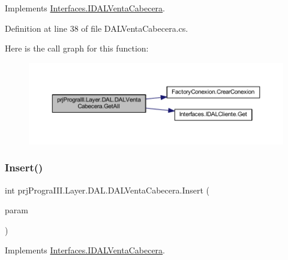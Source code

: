 Implements \hyperlink{interface_interfaces_1_1_i_d_a_l_venta_cabecera_a24d7801773ac5c75332be9f7efdd04b9}{Interfaces.\+I\+D\+A\+L\+Venta\+Cabecera}.



Definition at line 38 of file D\+A\+L\+Venta\+Cabecera.\+cs.

Here is the call graph for this function\+:
\nopagebreak
\begin{figure}[H]
\begin{center}
\leavevmode
\includegraphics[width=350pt]{classprj_progra_i_i_i_1_1_layer_1_1_d_a_l_1_1_d_a_l_venta_cabecera_a136378281851cb3aa0f0791a076b1351_cgraph}
\end{center}
\end{figure}
\hypertarget{classprj_progra_i_i_i_1_1_layer_1_1_d_a_l_1_1_d_a_l_venta_cabecera_a2eecc7b4375e75276b9547217d9727cf}{}\label{classprj_progra_i_i_i_1_1_layer_1_1_d_a_l_1_1_d_a_l_venta_cabecera_a2eecc7b4375e75276b9547217d9727cf} 
\subsubsection{\texorpdfstring{Insert()}{Insert()}}
{\footnotesize\ttfamily int prj\+Progra\+I\+I\+I.\+Layer.\+D\+A\+L.\+D\+A\+L\+Venta\+Cabecera.\+Insert (\begin{DoxyParamCaption}\item[{\hyperlink{classprj_progra_i_i_i_1_1_layer_1_1_entities_1_1_venta_cabecera}{Venta\+Cabecera}}]{param }\end{DoxyParamCaption})}



Implements \hyperlink{interface_interfaces_1_1_i_d_a_l_venta_cabecera_a7da4b1733d4a28cbfe906d018d344355}{Interfaces.\+I\+D\+A\+L\+Venta\+Cabecera}.



